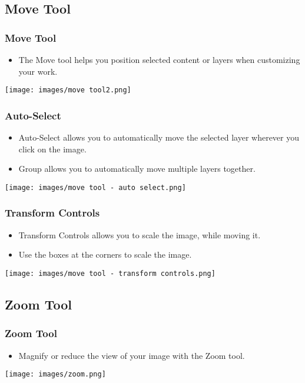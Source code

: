 \documentclass{beamer}
\begin{document}
\subsection{Move Tool}
\begin{frame}
	\frametitle{Move Tool}
	\begin{itemize}
		\item The Move tool helps you position selected content or layers when customizing your work.
	\end{itemize}
	\begin{center}
		\texttt{[image: images/move tool2.png]}
	\end{center}
\end{frame}

\begin{frame}
	\frametitle{Auto-Select}
	\begin{itemize}
		\item Auto-Select allows you to automatically move the selected layer wherever you click on the image.
		\item Group allows you to automatically move multiple layers together.
	\end{itemize}
	\begin{center}
		\texttt{[image: images/move tool - auto select.png]}
	\end{center}
\end{frame}

\begin{frame}
	\frametitle{Transform Controls}
	\begin{itemize}
		\item Transform Controls allows you to scale the image, while moving it.
		\item Use the boxes at the corners to scale the image.
	\end{itemize}
	\begin{center}
		\texttt{[image: images/move tool - transform controls.png]}
	\end{center}
\end{frame}

\subsection{Zoom Tool}
\begin{frame}
	\frametitle{Zoom Tool}
	\begin{itemize}
		\item Magnify or reduce the view of your image with the Zoom tool.
	\end{itemize}
	\begin{center}
		\texttt{[image: images/zoom.png]}
	\end{center}
\end{frame}
\end{document}
